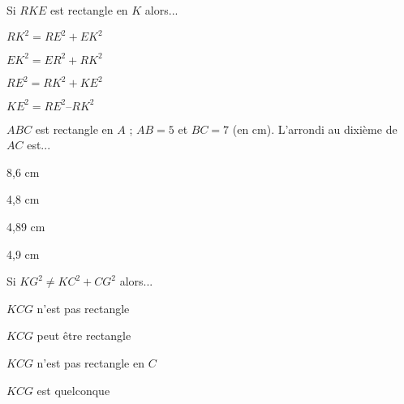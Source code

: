 


\begin{QCM}

\begin{GroupeQCM}

\begin{exercice}Si $RKE$ est rectangle en $K$ alors...
\begin{ChoixQCM}{4}
\item $RK^2 = RE^2 + EK^2$
\item $EK^2 = ER^2 + RK^2$
\item $RE^2 = RK^2 + KE^2$
\item $KE^2 = RE^2 – RK^2$
\end{ChoixQCM}
\begin{corrige}
\end{corrige}
\end{exercice}

\begin{exercice}$ABC$ est rectangle en $A$ ; $AB = 5$ et $BC = 7$ (en cm). L'arrondi au dixième de $AC$ est...
\begin{ChoixQCM}{4}
\item 8,6 cm
\item 4,8 cm
\item 4,89 cm
\item 4,9 cm
\end{ChoixQCM}
\begin{corrige}
\end{corrige}
\end{exercice}

\begin{exercice}Si $KG^2 \neq KC^2 + CG^2$ alors...
\begin{ChoixQCM}{4}
\item $KCG$ n'est pas rectangle
\item $KCG$ peut être rectangle
\item $KCG$ n'est pas rectangle en $C$
\item $KCG$ est quelconque
\end{ChoixQCM}
\begin{corrige}
\end{corrige}
\end{exercice}

\begin{exercice}


\end{exercice}
\end{GroupeQCM}
\end{QCM}
